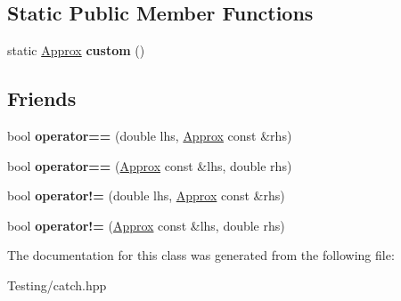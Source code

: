 \subsection*{Static Public Member Functions}
\begin{DoxyCompactItemize}
\item 
\hypertarget{class_catch_1_1_detail_1_1_approx_aaf86dc0ee92272ac2d9839197a07951d}{static \hyperlink{class_catch_1_1_detail_1_1_approx}{Approx} {\bfseries custom} ()}\label{class_catch_1_1_detail_1_1_approx_aaf86dc0ee92272ac2d9839197a07951d}

\end{DoxyCompactItemize}
\subsection*{Friends}
\begin{DoxyCompactItemize}
\item 
\hypertarget{class_catch_1_1_detail_1_1_approx_ac766f044f1c63f0c5997982baefd9049}{bool {\bfseries operator==} (double lhs, \hyperlink{class_catch_1_1_detail_1_1_approx}{Approx} const \&rhs)}\label{class_catch_1_1_detail_1_1_approx_ac766f044f1c63f0c5997982baefd9049}

\item 
\hypertarget{class_catch_1_1_detail_1_1_approx_a35999631e6cef569f9da9f3fa910db22}{bool {\bfseries operator==} (\hyperlink{class_catch_1_1_detail_1_1_approx}{Approx} const \&lhs, double rhs)}\label{class_catch_1_1_detail_1_1_approx_a35999631e6cef569f9da9f3fa910db22}

\item 
\hypertarget{class_catch_1_1_detail_1_1_approx_a83b3763569a7ecc143c335b630be0e47}{bool {\bfseries operator!=} (double lhs, \hyperlink{class_catch_1_1_detail_1_1_approx}{Approx} const \&rhs)}\label{class_catch_1_1_detail_1_1_approx_a83b3763569a7ecc143c335b630be0e47}

\item 
\hypertarget{class_catch_1_1_detail_1_1_approx_a7497ef839f8026cc0edd6269a80f3e09}{bool {\bfseries operator!=} (\hyperlink{class_catch_1_1_detail_1_1_approx}{Approx} const \&lhs, double rhs)}\label{class_catch_1_1_detail_1_1_approx_a7497ef839f8026cc0edd6269a80f3e09}

\end{DoxyCompactItemize}


The documentation for this class was generated from the following file\-:\begin{DoxyCompactItemize}
\item 
Testing/catch.\-hpp\end{DoxyCompactItemize}
